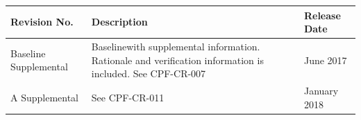 \documentclass[12pt,oneside,oldfontcommands]{memoir}
\def\releasedate{17 January 2018}
\def\revision{A Supplemental }
\begin{document}
% 
% 
\sffamily
\bfseries
{}
\normalfont
\centering
\begin{table}[htbp]
\begin{minipage}{\linewidth}
\setlength{\tymax}{0.5\linewidth}
\centering
\small
\begin{tabular}{| >{\centering\arraybackslash}m{1.25in}| >{\centering\arraybackslash}m{2.95in}| >{\centering\arraybackslash}m{1.5in}|} \hline
\bfseries{Revision No.} & \bfseries{Description} & \bfseries{Release Date}\\
\hline
Baseline Supplemental& Baselinewith supplemental information. Rationale and verification information is included. See CPF-CR-007 & 29 June 2017 \\
\hline
\revision & See CPF-CR-011 & \releasedate \\
\hline
\end{tabular}
\end{minipage}
\end{table}
% 
\end{document}

